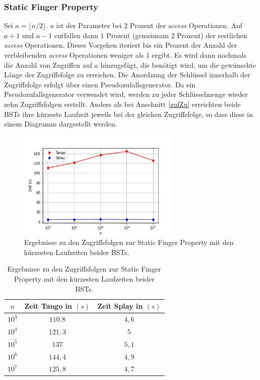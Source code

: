 \documentclass[a4paper,12pt]{article}
\begin{document}
\subsubsection{Static Finger Property}
Sei $a = \lfloor n / 2\rfloor$.  $a$ ist der Parameter bei $2$ Prozent der \textit{access} Operationen. Auf $a+1$ und $a-1$ entfallen dann $1$ Prozent (gemeinsam $2$ Prozent) der restlichen \textit{access} Operationen. Dieses Vorgehen iteriert bis ein Prozent der Anzahl der verbleibenden \textit{access} Operationen weniger als $1$ ergibt. Es wird dann nochmals die Anzahl von Zugriffen auf $a$ hinzugefügt, die benötigt wird, um die gewünschte Länge der Zugriffsfolge zu erreichen. Die Anordnung der Schlüssel innerhalb der Zugriffsfolge erfolgt über einen Pseudozufallsgenerator. Da ein Pseudozufallsgenerator verwendet wird, werden zu jeder Schlüsselmenge wieder zehn Zugriffsfolgen erstellt. Anders als bei Anschnitt \ref{zufZu} erreichten beide BSTs ihre kürzeste Laufzeit jeweils bei der gleichen Zugriffsfolge, so dass diese in einem Diagramm dargestellt werden.\\ 
\begin{figure}[H]
	\centering
	\includegraphics[width=0.7\textwidth]{Medien/laufzeittest/diagramm/staticfinger1}
	\caption{Ergebnisse zu den Zugriffsfolgen zur Static Finger Property mit den kürzesten Laufzeiten beider BSTs.}
\end{figure}
\begin{table}[H]
	\begin{center}
		\begin{tabular}[c]{|c|c|c|}
			\hline
			$n$ & Zeit Tango in $\left(s\right)$ &Zeit Splay in $\left(s\right)$ \\
			\hline
			$10^3$ & $110.8$ &$4,6$ \\
			\hline
			$10^4$  & $121,3$ &$5$  \\
			\hline
			$10^5$  & $137$ &  $5,1$  \\
			\hline
			$10^6$  & $144,4$ &$4,9$  \\
			\hline
			$10^7$  & $125,8$ &$4,7$  \\
			\hline
		\end{tabular}
		\caption{Ergebnisse zu den Zugriffsfolgen zur Static Finger Property mit den kürzesten Laufzeiten beider BSTs.} 
	\end{center}
\end{table}
\end{document}
